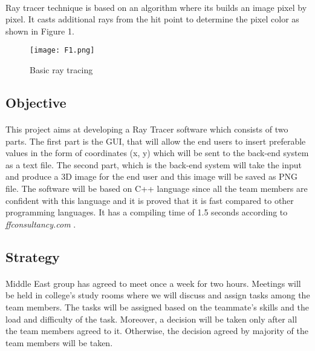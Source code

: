 \documentclass{article}
\begin{document}
\paragraph{}
Ray tracer technique is based on an algorithm where its builds an image pixel by pixel. It casts additional rays from the hit point to determine the pixel color as shown in Figure 1.


\begin{figure}
    \centering
    \texttt{[image: F1.png]}
    \caption{Basic ray tracing}
    \label{figure1}
\end{figure}

\subsection{Objective}

\paragraph{}
This project aims at developing a Ray Tracer software which consists of two parts. The first part is the GUI, that will allow the end users to insert preferable values in the form of coordinates (x, y) which will be sent to the back-end system as a text file.
The second part, which is the back-end system will take the input and produce  a 3D image for the end user and this image will be saved as PNG file. 
The software will be based on C++ language since all the team members are confident with this language and it is proved that it is fast compared to other programming languages. It has a compiling time of 1.5 seconds according to \textit{ffconsultancy.com }.

\subsection{Strategy}
\paragraph{}
Middle East group has agreed to meet once a week for two hours. Meetings will be held in college's study rooms where we will discuss and assign tasks among the team members. The tasks will be assigned based on the teammate's skills and the load and difficulty of the task. Moreover,  a decision will be taken only after all the team members agreed to it. Otherwise, the decision agreed by majority of the team members will be taken.
\end{document}
